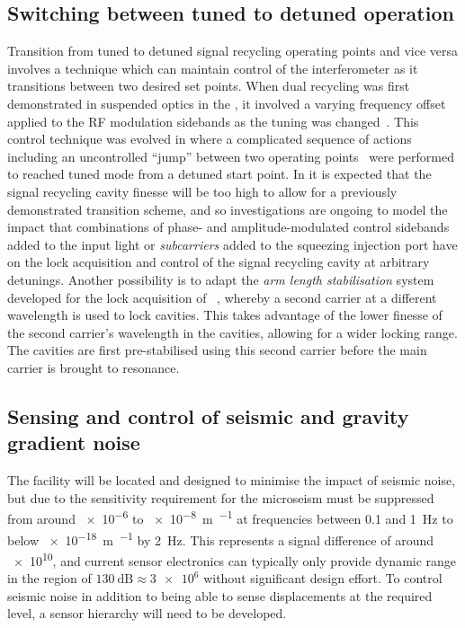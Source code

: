 \subsection{Switching between tuned to detuned operation}
Transition from tuned to detuned signal recycling operating points and vice versa involves a technique which can maintain control of the interferometer as it transitions between two desired set points. When dual recycling was first demonstrated in suspended optics in the \GARCHINGPROTOTYPE{}, it involved a varying frequency offset applied to the \gls{RF} modulation sidebands as the tuning was changed~\cite{Freise2000}. This control technique was evolved in \GEO{} where a complicated sequence of actions~\cite{Grote2004} including an uncontrolled ``jump'' between two operating points~\cite{Hild2007} were performed to reached tuned mode from a detuned start point. In \ETLF{} it is expected that the signal recycling cavity finesse will be too high to allow for a previously demonstrated transition scheme, and so investigations are ongoing to model the impact that combinations of phase- and amplitude-modulated control sidebands added to the input light or \emph{subcarriers} added to the squeezing injection port have on the lock acquisition and control of the signal recycling cavity at arbitrary detunings. Another possibility is to adapt the \emph{arm length stabilisation} system developed for the lock acquisition of \ALIGO{}~\cite{Mullavey2012, Staley2014}, whereby a second carrier at a different wavelength is used to lock cavities. This takes advantage of the lower finesse of the second carrier's wavelength in the cavities, allowing for a wider locking range. The cavities are first pre-stabilised using this second carrier before the main carrier is brought to resonance.

\subsection{Sensing and control of seismic and gravity gradient noise}
The \ET{} facility will be located and designed to minimise the impact of seismic noise, but due to the sensitivity requirement for \ETLF{} the microseism must be suppressed from around \num{e-6} to \SI{e-8}{\meter\per\sqrthz} at frequencies between \num{0.1} and \SI{1}{\hertz} to below \SI{e-18}{\meter\per\sqrthz} by \SI{2}{\hertz}. This represents a signal difference of around \num{e10}, and current sensor electronics can typically only provide dynamic range in the region of $\SI{130}{\deci\bel} \approx \num{3e6}$ without significant design effort. To control seismic noise in addition to being able to sense displacements at the required level, a sensor hierarchy will need to be developed.

